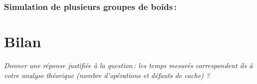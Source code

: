 \documentclass[a4paper, 10pt, french]{article}
\begin{document}
      \subsubsection{Simulation de plusieurs groupes de boids\,: } 
      {
      
      }

\section{Bilan}
{\em Donner  une réponse justifiée  à la question\,: 
              les  temps mesurés correspondent ils  à votre analyse théorique (nombre d’opérations et défauts de cache) ?
}
\end{document}
